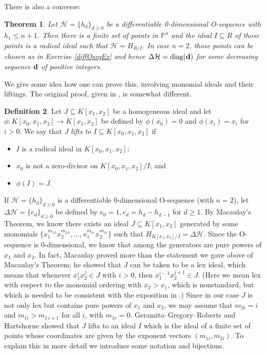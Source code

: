 \documentclass[11pt,twoside]{amsart}
\numberwithin{equation}{section}
\newtheorem{theorem}{Theorem}[section]
\theoremstyle{definition}
\newtheorem{definition}[theorem]{Definition}
\begin{document}
There is also a converse:

\begin{theorem}\cite{refGMR}\label{GMRthm}
Let $\mathcal{H} = \{h_d\}_{d \geq 0}$ be a differentiable 0-dimensional
O-sequence with $h_1 \leq n+1$. Then there is a finite set of points in ${\mathbb{P}^{n}}$
and the ideal $I \subseteq R$ of those points is a radical ideal
such that $\mathcal{H} = H_{R/I}$. In case $n=2$, those points
can be chosen as in Exercise \ref{diffOseqEx} and hence
$\Delta \mathcal{H}=\operatorname{diag}({\bf d})$ for some decreasing sequence
${\bf d}$ of positive integers.
\end{theorem}

We give some idea how one can prove this, involving
monomial ideals and their liftings. The original proof, given in \cite{refGMR},
is somewhat different.

\begin{definition}
Let $J \subseteq {K}[x_1, x_2]$ be a homogeneous ideal
and let $\phi:{K}[x_0, x_1, x_2]\to {K}[x_1, x_2]$
be defined by $\phi(x_0)=0$ and $\phi(x_i)=x_i$ for $i>0$.
We say that $J$ \emph{lifts to $I \subseteq {K}[x_0, x_1, x_2]$} if
\begin{itemize}
\item $I$ is a radical ideal in ${K}[x_0, x_1, x_2]$;
\item $x_0$ is not a zero-divisor on ${K}[x_0, x_1, x_2]/I$; and
\item $\phi(I)=J$.
\end{itemize} 
\end{definition}

If $\mathcal{H} = \{h_d\}_{d \geq 0}$ is a differentiable 0-dimensional O-sequence 
(with $n=2$), let $\Delta \mathcal{H} = \{e_d\}_{d \geq 0}$ be defined 
by $e_0 = 1, e_d = h_d-h_{d-1}$ for $d \geq 1$.  By Macaulay's Theorem, 
we know there exists an ideal $J \subseteq {K}[x_1, x_2]$ generated by some monomials 
$\{x_1^{m_{1\,0}}x_2^{m_{2\,0}},\ldots,x_1^{m_{1r}}x_2^{m_{2r}}\}$
such that $H_{{K}[x_1, x_2]/J} = \Delta \mathcal{H}$. 
Since the O-sequence is 0-dimensional, we know that
among the generators are pure powers of $x_1$ and $x_2$.
In fact, Macaulay proved more
than the statement we gave above of Macaulay's Theorem; he showed that 
$J$ can be taken to be a lex ideal,
which means that whenever $x_1^ix_2^j\in J$ with $i>0$, then 
$x_1^{i-1}x_2^{j+1}\in J$. (Here we mean lex with respect to the monomial ordering
with $x_2>x_1$, which is nonstandard, but which is needed to be consistent
with the exposition in \cite{refGGR}.)
Since in our case $J$ is not only lex but 
contains pure powers of $x_1$ and $x_2$, we may assume that 
$m_{2i}=i$ and $m_{1i}>m_{1\,i+1}$ for all $i$, with $m_{1r}=0$.
Geramita--Gregory--Roberts \cite{refGGR} and Hartshorne \cite{refHt} 
showed that $J$ lifts to an ideal $I$ which is the ideal of a 
finite set of points whose coordinates are
given by the exponent vectors $(m_{1i},m_{2i})$.
To explain this in more detail we introduce some notation and bijections.
\end{document}
